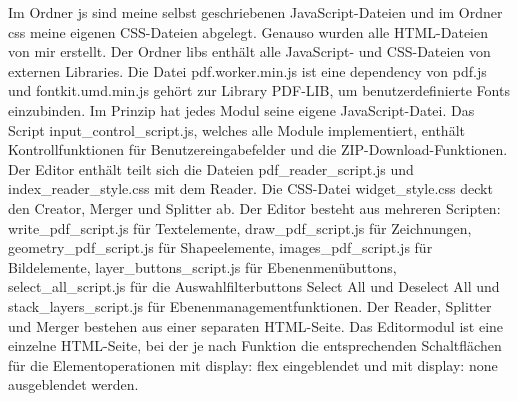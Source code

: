 Im Ordner js sind meine selbst geschriebenen JavaScript-Dateien und im Ordner css meine eigenen CSS-Dateien abgelegt. Genauso wurden alle HTML-Dateien von mir erstellt. Der Ordner libs enthält alle JavaScript- und CSS-Dateien von externen Libraries. Die Datei pdf.worker.min.js ist eine dependency von pdf.js und fontkit.umd.min.js gehört zur Library PDF-LIB, um benutzerdefinierte Fonts einzubinden. Im Prinzip hat jedes Modul seine eigene JavaScript-Datei. Das Script input\_control\_script.js, welches alle Module implementiert, enthält Kontrollfunktionen für Benutzereingabefelder und die ZIP-Download-Funktionen. Der Editor enthält teilt sich die Dateien pdf\_reader\_script.js und index\_reader\_style.css mit dem Reader. Die CSS-Datei widget\_style.css deckt den Creator, Merger und Splitter ab. Der Editor besteht aus mehreren Scripten: write\_pdf\_script.js für Textelemente, draw\_pdf\_script.js für Zeichnungen, geometry\_pdf\_script.js für Shapeelemente, images\_pdf\_script.js für Bildelemente, layer\_buttons\_script.js für Ebenenmenübuttons, select\_all\_script.js für die Auswahlfilterbuttons Select All und Deselect All und stack\_layers\_script.js für Ebenenmanagementfunktionen. Der Reader, Splitter und Merger bestehen aus einer separaten HTML-Seite. Das Editormodul ist eine einzelne HTML-Seite, bei der je nach Funktion die entsprechenden Schaltflächen für die Elementoperationen mit display: flex eingeblendet und mit display: none ausgeblendet werden. 


